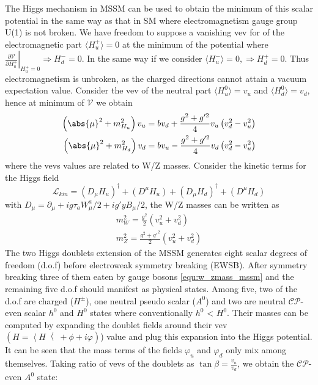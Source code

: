 The Higgs mechanism in MSSM can be used to obtain the minimum of this scalar potential in the same way as that in SM where electromagnetism gauge group U(1) is not broken. We have freedom to suppose a vanishing vev for of the electromagnetic part $\big \langle H_{u}^{+} \big \rangle = 0$ at the minimum of the potential where $\left.\frac{\partial \mathcal{V}}{\partial H^{+}_{u}}\right|_{H_{u}^{+}=0} \Rightarrow H_{d}^{-} = 0$. In the same way if we consider $\big \langle H_{u}^{-} \big \rangle = 0, \Rightarrow H_{d}^{+} = 0$. Thus electromagnetism is unbroken, as the charged directions cannot attain a vacuum expectation value. Consider the vev of the neutral part $\big \langle H_{u}^{0} \big \rangle = v_{u}$ and $\big \langle H_{d}^{0} \big \rangle = v_{d}$, hence at minimum of $\mathcal{V}$ we obtain
\begin{equation}
\begin{split}
\left(\abs{\mu}^{2} + m^{2}_{H_{u}}\right)v_{u} = bv_{d} + \frac{g^{2}+g'^{2}}{4}v_{u}\left(v_{d}^{2} - v_{u}^{2}\right)\\
\left(\abs{\mu}^{2} + m^{2}_{H_{d}}\right)v_{d} = bv_{u} - \frac{g^{2}+g'^{2}}{4}v_{d}\left(v_{d}^{2} - v_{u}^{2}\right)\\
\end{split}
\end{equation}
where the vevs values are related to W/Z masses. Consider the kinetic terms for the Higgs field
\begin{equation}
\mathcal{L}_{kin} = \left(D_{\mu}H_{u}\right)^{\dagger} + \left(D^{\mu}H_{u}\right) + \left(D_{\mu}H_{d}\right)^{\dagger} + \left(D^{\mu}H_{d}\right)
\end{equation}
with $D_{\mu} = \partial_{\mu} + ig\tau_{a}W_{\mu}^{a}/2 + ig'yB_{\mu}/2$, the W/Z masses can be written as
\begin{equation}\label{equ:w_zmass_mssm}
\begin{split}
m_{W}^{2} = \frac{g^{2}}{2}\left(v_{u}^{2} + v_{d}^{2}\right)\\
m_{Z}^{2} = \frac{g^{2}+g'^{2}}{2}\left(v_{u}^{2} + v_{d}^{2}\right)
\end{split}
\end{equation}
The two Higgs doublets extension of the MSSM generates eight scalar degrees of freedom (d.o.f) before electroweak symmetry breaking (EWSB). After symmetry breaking three of them eaten by gauge bosons \ref{equ:w_zmass_mssm} and the remaining five d.o.f should manifest as physical states. Among five, two of the d.o.f are charged ($H^{\pm}$), one neutral pseudo scalar ($A^{0}$) and two are neutral $\mathcal{CP}$-even scalar $h^{0}$ and $H^{0}$ states where conventionally $h^{0}$ < $H^{0}$. Their masses can be computed by expanding the doublet fields around their vev $\left( H = \left\langle H \right\langle + \phi + i\varphi \right)$) value and plug this expansion into the Higgs potential. It can be seen that the mass terms of the fields $\varphi_{u}$ and $\varphi_{d}$ only mix among themselves. Taking ratio of vevs of the doublets as $\tan\beta = \frac{v_{u}}{v_{d}}$, we obtain the $\mathcal{CP}$-even $A^{0}$ state:
